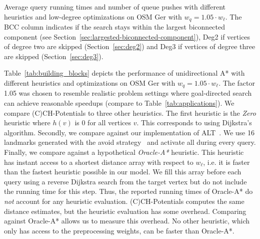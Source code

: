 \documentclass[manuscript]{acmart}
\begin{document}
\begin{table}
\centering
\caption{
Average query running times and number of queue pushes with different heuristics and low-degree optimizations on OSM Ger with $w_q = 1.05 \cdot w_\ell$.
The BCC column indicates if the search stays within the largest biconnected component (see Section~\ref{sec:largested-biconnected-component}), Deg2 if vertices of degree two are skipped (Section~\ref{sec:deg2}) and Deg3 if vertices of degree three are skipped (Section~\ref{sec:deg3}).
}\label{tab:building_blocks}

\end{table}

Table~\ref{tab:building_blocks} depicts the performance of unidirectional A* with different heuristics and optimizations on OSM Ger with $w_q = 1.05 \cdot w_\ell$.
The factor 1.05 was chosen to resemble realistic problem settings where goal-directed search can achieve reasonable speedups (compare to Table~\ref{tab:applications}).
We compare (C)CH-Potentials to three other heuristics.
The first heuristic is the \emph{Zero} heuristic where $h(v)$ is $0$ for all vertices $v$.
This corresponds to using Dijkstra's algorithm.
Secondly, we compare against our implementation of ALT~\cite{gw-cppsp-05}.
We use 16 landmarks generated with the avoid strategy~\cite{gw-cppsp-05} and activate all during every query.
Finally, we compare against a hypothetical \emph{Oracle-A*} heuristic.
This heuristic has instant access to a shortest distance array with respect to $w_\ell$, i.e. it is faster than the fastest heuristic possible in our model.
We fill this array before each query using a reverse Dijkstra search from the target vertex but do not include the running time for this step.
Thus, the reported running times of Oracle-A* do \emph{not} account for any heuristic evaluation.
(C)CH-Potentials computes the same distance estimates, but the heuristic evaluation has some overhead.
Comparing against Oracle-A* allows us to measure this overhead.
No other heuristic, which only has access to the preprocessing weights, can be faster than Oracle-A*.
\end{document}
